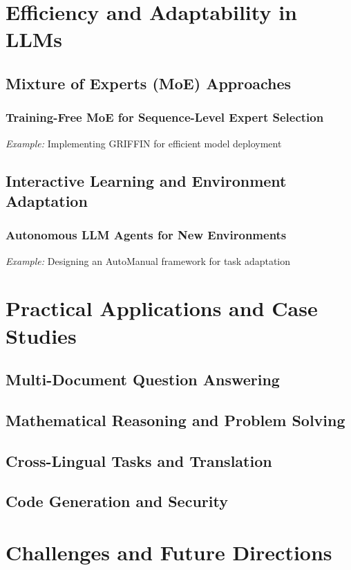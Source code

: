 \documentclass{book}
\begin{document}
\chapter{Efficiency and Adaptability in LLMs}
\section{Mixture of Experts (MoE) Approaches}
\subsection{Training-Free MoE for Sequence-Level Expert Selection}
\textit{Example:} Implementing GRIFFIN for efficient model deployment \cite{dong2024}

\section{Interactive Learning and Environment Adaptation}
\subsection{Autonomous LLM Agents for New Environments}
\textit{Example:} Designing an AutoManual framework for task adaptation \cite{chen2024}

\chapter{Practical Applications and Case Studies}
\section{Multi-Document Question Answering}
\section{Mathematical Reasoning and Problem Solving}
\section{Cross-Lingual Tasks and Translation}
\section{Code Generation and Security}

\chapter{Challenges and Future Directions}
\end{document}
